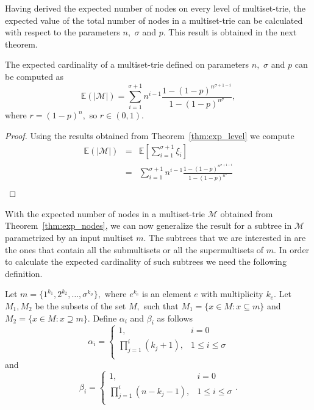 Having derived the expected number of nodes on every level of multiset-trie, the
expected value of the total number of nodes in a multiset-trie can be calculated 
with respect to the parameters $n,$ $\sigma$ and $p.$ This result is obtained in 
the next theorem.

\begin{theorem}\label{thm:exp_nodes}
The expected cardinality of a multiset-trie defined on parameters $n,$ $\sigma$ 
and $p$ can be computed as 
\begin{equation}
\mathbb{E}( | \mathcal{M} | ) = \sum_{i=1}^{\sigma+1} n^{i-1} \frac{1-(1-p)^{n^{\sigma +1 -i}}}{1-(1-p)^{n^{\sigma}}},
\end{equation}
where $r = (1-p)^n,$ so $r\in(0,1).$
\end{theorem}
\begin{proof}
Using the results obtained from Theorem~\ref{thm:exp_level} we compute 
\begin{eqnarray*}
\mathbb{E}( | \mathcal{M} | ) &=& \mathbb{E}\left[ \sum_{i=1}^{\sigma+1} \xi_i \right] \\
&=& \sum_{i=1}^{\sigma + 1} n^{i-1} \frac{1-(1-p)^{n^{\sigma + 1 -i}}}{1-(1-p)^{n^{\sigma}}} \\
\end{eqnarray*}
\end{proof}

With the expected number of nodes in a multiset-trie $\mathcal{M}$ obtained from 
Theorem~\ref{thm:exp_nodes}, we can now generalize the result for a subtree 
in $\mathcal{M}$ parametrized by an input multiset $m.$ The subtrees that we 
are interested in are the ones that contain all the submultisets or all the 
supermultisets of $m.$ In order to calculate the expected cardinality of such 
subtrees we need the following definition. 

\begin{definition}\label{def:params}
Let $m = \{ 1^{k_1}, 2^{k_2}, \ldots, \sigma^{k_\sigma} \},$ where 
$e^{k_e}$ is an element $e$ with multiplicity $k_e.$ Let $M_1, M_2$ be 
the subsets of the set $M,$ such that $M_1 = \{ x\in M : x\subseteq m \}$ and 
$M_2 = \{ x\in M : x\supseteq m \}.$
Define $\alpha_i$ and $\beta_i$ as follows 
\begin{equation*}
\alpha_i = \begin{cases}
1, & i=0 \\
\prod_{j=1}^i (k_j+1), & 1\leq i\leq\sigma \\
\end{cases}
\end{equation*} 
and 
\begin{equation*}
\beta_i = \begin{cases}
1, & i=0 \\
\prod_{j=1}^i (n-k_j-1), & 1\leq i\leq\sigma \\
\end{cases}.
\end{equation*}
\end{definition}

